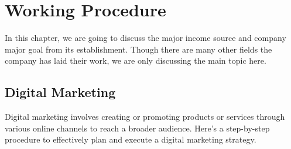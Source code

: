 \chapter{Working Procedure}
In this chapter, we are going to discuss the major income source and company major goal from its establishment. Though there are many other fields the company has laid their work, we are only discussing the main topic here.
\section{Digital Marketing}
Digital marketing involves creating or promoting products or services through various online channels to reach a broader audience. Here's a step-by-step procedure to effectively plan and execute a digital marketing strategy.

